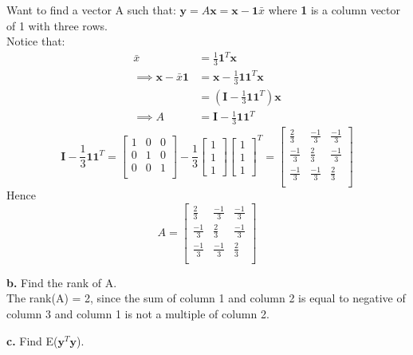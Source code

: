 \documentclass[12 pt, a4paper]{article}
\begin{document}
\noindent Want to find a vector A such that: $\textbf{y}=A\textbf{x}=\textbf{x}-\textbf{1}\bar{x} $ where \textbf{1} is a column vector of 1 with three rows. \\
Notice that:
\begin{align*}
\bar{x}&=\frac{1}{3}\textbf{1}^T\textbf{x} \\
\implies \textbf{x}-\bar{x}\textbf{1}&= \textbf{x}-\frac{1}{3}\textbf{1}\textbf{1}^T\textbf{x} \\
 &=(\textbf{I}-\frac{1}{3}\textbf{11}^T)\textbf{x}\\
 \implies A &= \textbf{I}-\frac{1}{3}\textbf{11}^T
\end{align*}
\[
 \textbf{I}-\frac{1}{3}\textbf{11}^T = 
 \begin{bmatrix}
 1 & 0 & 0 \\ 
 0 & 1 & 0 \\
 0 & 0 & 1\\
 \end{bmatrix} - \frac{1}{3}
 \begin{bmatrix}
1 \\ 1 \\ 1
 \end{bmatrix}
  \begin{bmatrix}
1 \\ 1 \\ 1
 \end{bmatrix}^T = 
 \begin{bmatrix}
 \frac{2}{3} & \frac{-1}{3} & \frac{-1}{3} \\
 \frac{-1}{3} & \frac{2}{3} & \frac{-1}{3} \\
 \frac{-1}{3} & \frac{-1}{3} & \frac{2}{3} \\
 \end{bmatrix}
\]
Hence \[ A = \begin{bmatrix}
\frac{2}{3} & \frac{-1}{3} & \frac{-1}{3} \\
 \frac{-1}{3} & \frac{2}{3} & \frac{-1}{3} \\
 \frac{-1}{3} & \frac{-1}{3} & \frac{2}{3} \\
\end{bmatrix}
\]

\noindent \textbf{b.} Find the rank of A.\\

\noindent The rank(A) = 2, since the sum of column 1 and column 2 is equal to negative of column 3 and column 1 is not a multiple of column 2. 


\noindent \textbf{c.} Find E($\textbf{y}^T\textbf{y}$).
\end{document}
